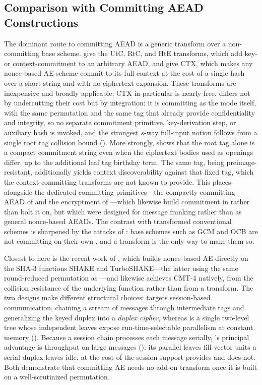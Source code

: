 \subsection{Comparison with Committing AEAD Constructions}
\label{sec:compare-commit}

The dominant route to committing AEAD is a generic transform over a
non-committing base scheme. \cite{BH22} give the \textsf{UtC}, \textsf{RtC}, and
\textsf{HtE} transforms, which add key- or context-commitment to an arbitrary
AEAD, and \cite{CR22} give \textsf{CTX}, which makes any nonce-based AE scheme
commit to its full context at the cost of a single hash over a short string and
with no ciphertext expansion. These transforms are inexpensive and broadly
applicable; \textsf{CTX} in particular is nearly free. \TW{} differs not by
undercutting their cost but by integration: it is committing as the mode itself,
with the same permutation and the same tag that already provide confidentiality
and integrity, so no separate commitment primitive, key-derivation step, or
auxiliary hash is invoked, and the strongest $s$-way full-input notion follows
from a single root tag collision bound (). More strongly,
 shows that the root tag alone is a compact commitment
string even when the ciphertext bodies used as openings differ, up to the
additional leaf tag birthday term. The same tag, being preimage-resistant,
additionally yields context discoverability against that fixed tag, which the
context-committing transforms are not known to provide. This places \TW{}
alongside the dedicated committing primitives---the compactly committing AEAD of
\cite{GLR17} and the encryptment of \cite{DGRW18}---which likewise build
commitment in rather than bolt it on, but which were designed for message
franking rather than as general nonce-based AEADs. The contrast with transformed
conventional schemes is sharpened by the attacks of : base
schemes such as GCM and OCB are not committing on their own \cite{CR22}, and a
transform is the only way to make them so.

Closest to \TW{} here is the recent work of \cite{DHMVV24}, which builds
nonce-based AE directly on the SHA-3 functions \textsf{SHAKE} and
\textsf{TurboSHAKE}---the latter using the same round-reduced \Keccak{}
permutation as \TW{}---and likewise achieves \textsf{CMT-4} natively, from the
collision resistance of the underlying function rather than from a transform. The
two designs make different structural choices: \cite{DHMVV24} targets
session-based communication, chaining a stream of messages through intermediate
tags and generalizing the keyed duplex into a \emph{duplex cipher}, whereas \TW{}
is a single two-level tree whose independent leaves expose run-time-selectable
parallelism at constant memory (). Because a session
chain processes each message serially, \TW{}'s principal advantage is throughput
on large messages (): its parallel leaves fill vector units
a serial duplex leaves idle, at the cost of the session support \cite{DHMVV24}
provides and \TW{} does not. Both demonstrate
that committing AE needs no add-on transform once it is built on a
well-scrutinized \Keccak{} permutation.

